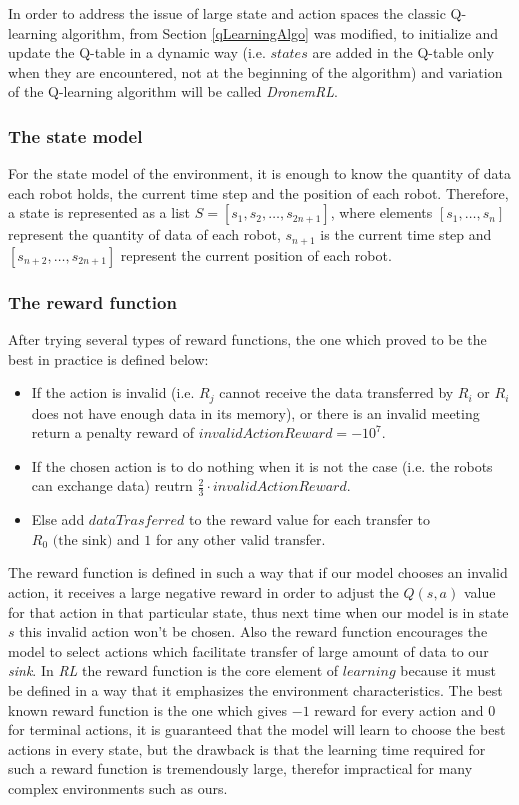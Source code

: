 \par In order to address the issue of large state and action spaces the classic Q-learning algorithm, from Section \ref{qLearningAlgo} was modified, to initialize and update the Q-table in a dynamic way (i.e. $states$ are added in the Q-table only when they are encountered, not at the beginning of the algorithm) and variation of the Q-learning algorithm will be called \emph{DronemRL}.

\subsubsection{The state model}
For the state model of the environment, it is enough to know the quantity of data each robot holds, the current time step and the position of each robot.
Therefore, a state is represented as a list $S=[s_1, s_2, \dots, s_{2n + 1}]$, where elements $[s_1, \dots, s_n]$ represent the quantity of data of each robot, $s_{n + 1}$ is the current time step and $[s_{n + 2}, \dots ,s_{2n + 1}]$ represent the current position of each robot.

\subsubsection{The reward function}
After trying several types of reward functions, the one which proved to be the best in practice is defined below: 

\begin{itemize}
  \item If the action is invalid (i.e. $R_{j}$ cannot receive the data transferred by $R_{i}$ or $R_{i}$ does not have enough data in its memory), or there is an invalid meeting return a penalty reward of $invalidActionReward=-10^{7}$.
  \item If the chosen action is to do nothing when it is not the case (i.e. the robots can exchange data) reutrn $\frac{2}{3}\cdot invalidActionReward$.
  \item Else add  $dataTrasferred$ to the reward value for each transfer to $R_{0} \text{ (the sink)}$ and  $1$ for any other valid transfer.
\end{itemize}

The reward function is defined in such a way that if our model chooses an invalid action, it receives a large negative reward in order to adjust the $Q(s,a)$ value for that action in that particular state, thus next time when our model is in state $s$ this invalid action won't be chosen. Also the reward function encourages the model to select actions which facilitate transfer of large amount of data to our \emph{sink}. In \emph{RL} the reward function is the core element of $learning$ because it must be defined in a way that it emphasizes the environment characteristics. The best known reward function \cite{rsab} is the one which gives $-1$ reward for every action and $0$ for terminal actions, it is guaranteed that the model will learn to choose the best actions in every state, but the drawback is that the learning time required for such a reward function is tremendously large, therefor impractical for many complex environments such as ours.

